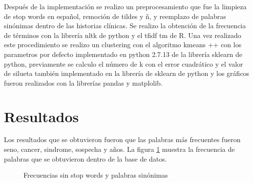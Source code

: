 Después de la implementación se realizo un preprocesamiento que fue la limpieza de stop words en español, remoción de tildes y ñ, y reemplazo de palabras sinónimas dentro de las historias clínicas. Se realizo la obtención de la frecuencia de términos con la librería nltk de python y el tfidf tm de R. Una vez realizado este procedimiento se realizo un clustering con el algoritmo kmeans ++  con los parametros por defecto implementado en python 2.7.13 de la librería sklearn de python, previamente se calculo el número de k con el error cuadrático y el valor de silueta también implementado en la librería de sklearn de python y los gráficos fueron realizados con la librerías pandas y matplolib.
 
\section{Resultados}

Los resultados que se obtuvieron fueron que las palabras más frecuentes fueron seno, cancer, sindrome, sospecha y años. La figura \ref{fig:sin} muestra la frecuencia de palabras que se obtuvieron dentro de la base de datos.

\begin{figure}[H]
	\centering
	\caption{Frecuencias sin stop words y palabras sinónimas} \label{fig:sin}
\end{figure} 

